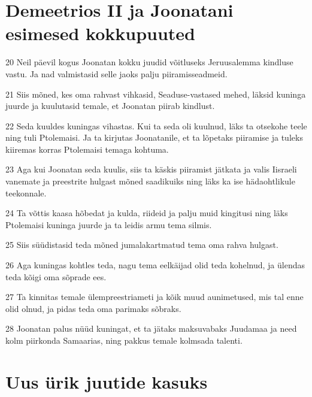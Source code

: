\section*{Demeetrios II ja Joonatani esimesed kokkupuuted}

\par 20 Neil päevil kogus Joonatan kokku juudid võitluseks Jeruusalemma kindluse vastu. Ja nad valmistasid selle jaoks palju piiramisseadmeid.
\par 21 Siis mõned, kes oma rahvast vihkasid, Seaduse-vastased mehed, läksid kuninga juurde ja kuulutasid temale, et Joonatan piirab kindlust.
\par 22 Seda kuuldes kuningas vihastas. Kui ta seda oli kuulnud, läks ta otsekohe teele ning tuli Ptolemaisi. Ja ta kirjutas Joonatanile, et ta lõpetaks piiramise ja tuleks kiiremas korras Ptolemaisi temaga kohtuma.
\par 23 Aga kui Joonatan seda kuulis, siis ta käskis piiramist jätkata ja valis Iisraeli vanemate ja preestrite hulgast mõned saadikuiks ning läks ka ise hädaohtlikule teekonnale.
\par 24 Ta võttis kaasa hõbedat ja kulda, riideid ja palju muid kingitusi ning läks Ptolemaisi kuninga juurde ja ta leidis armu tema silmis.
\par 25 Siis süüdistasid teda mõned jumalakartmatud tema oma rahva hulgast.
\par 26 Aga kuningas kohtles teda, nagu tema eelkäijad olid teda kohelnud, ja ülendas teda kõigi oma sõprade ees.
\par 27 Ta kinnitas temale ülempreestriameti ja kõik muud aunimetused, mis tal enne olid olnud, ja pidas teda oma parimaks sõbraks.
\par 28 Joonatan palus nüüd kuningat, et ta jätaks maksuvabaks Juudamaa ja need kolm piirkonda Samaarias, ning pakkus temale kolmsada talenti. 

\section*{Uus ürik juutide kasuks}

